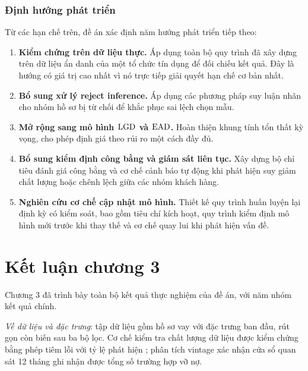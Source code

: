 \subsubsection{Định hướng phát triển}

Từ các hạn chế trên, đề án xác định năm hướng phát triển tiếp theo:

\begin{enumerate}[label=(\arabic*)]
  \item \textbf{Kiểm chứng trên dữ liệu thực.} Áp dụng toàn bộ quy trình đã xây
  dựng trên dữ liệu ẩn danh của một tổ chức tín dụng để đối chiếu kết quả. Đây là
  hướng có giá trị cao nhất vì nó trực tiếp giải quyết hạn chế cơ bản nhất.

  \item \textbf{Bổ sung xử lý reject inference.} Áp dụng các phương pháp suy luận
  nhãn cho nhóm hồ sơ bị từ chối để khắc phục sai lệch chọn mẫu.

  \item \textbf{Mở rộng sang mô hình $\mathrm{LGD}$ và $\mathrm{EAD}$.} Hoàn thiện khung tính tổn
  thất kỳ vọng, cho phép định giá theo rủi ro một cách đầy đủ.

  \item \textbf{Bổ sung kiểm định công bằng và giám sát liên tục.} Xây dựng bộ chỉ
  tiêu đánh giá công bằng và cơ chế cảnh báo tự động khi phát hiện suy giảm chất
  lượng hoặc chênh lệch giữa các nhóm khách hàng.

  \item \textbf{Nghiên cứu cơ chế cập nhật mô hình.} Thiết kế quy trình huấn luyện
  lại định kỳ có kiểm soát, bao gồm tiêu chí kích hoạt, quy trình kiểm định mô
  hình mới trước khi thay thế và cơ chế quay lui khi phát hiện vấn đề.
\end{enumerate}

\section*{Kết luận chương 3}

Chương 3 đã trình bày toàn bộ kết quả thực nghiệm của đề án, với năm nhóm kết quả
chính.

\textit{Về dữ liệu và đặc trưng}: tập dữ liệu gồm \NTotal{} hồ sơ vay với
\NFeaturesInitial{} đặc trưng ban đầu, rút gọn còn \NFeaturesSelected{} biến sau
ba bộ lọc. Cơ chế kiểm tra chất lượng dữ liệu được kiểm chứng bằng phép tiêm lỗi
với tỷ lệ phát hiện \ValidityDetected{}; phân tích vintage xác nhận cửa sổ quan
sát 12 tháng ghi nhận được \VintageCoverage{} tổng số trường hợp vỡ nợ.

